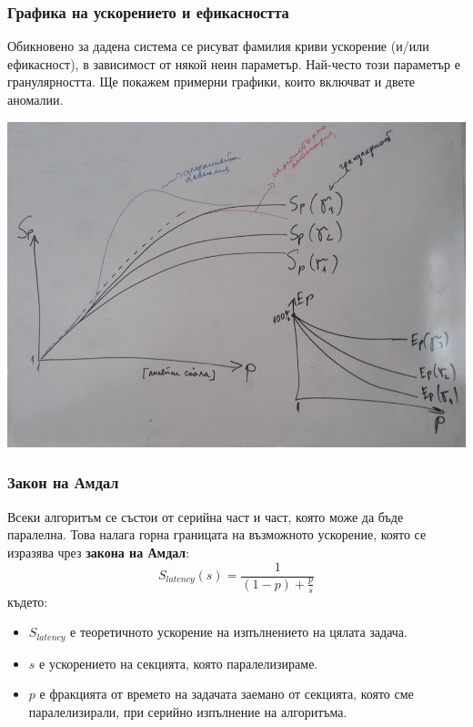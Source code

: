 \documentclass[fleqn,12pt]{article}
\begin{document}
\subsubsection{Графика на ускорението и ефикасността}
Обикновено за дадена система се рисуват фамилия криви ускорение (и/или ефикасност), в зависимост от някой неин параметър.
Най-често този параметър е гранулярността. Ще покажем примерни графики, които включват и двете аномалии.

\begin{center}\includegraphics[width=180mm]{speedup_efficiency.png}\end{center}

\subsubsection{Закон на Амдал}
Всеки алгоритъм се състои от серийна част и част, която може да бъде паралелна. Това налага горна границата на 
възможното ускорение, която се изразява чрез \textbf{закона на Амдал}:
\[ S_{latency}(s) = \frac{1}{(1-p) + \frac{p}{s}} \]
където:
\begin{itemize}
    \item $S_{latency}$ е теоретичното ускорение на изпълнението на цялата задача.
    \item $s$ е ускорението на секцията, която паралелизираме.
    \item $p$ е фракцията от времето на задачата заемано от секцията, която сме паралелизирали, при серийно изпълнение на алгоритъма.
\end{itemize}
\end{document}
